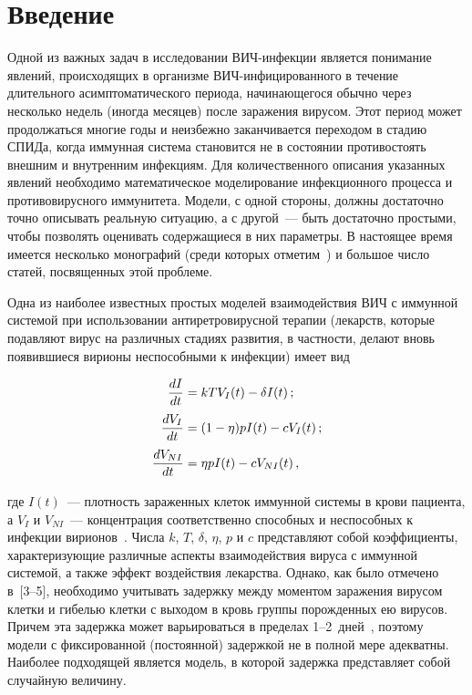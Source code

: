       \begin{multicols}{2}

      \label{st\stat}


\section{Введение}

Одной из важных задач в исследовании ВИЧ-ин\-фек\-ции  является
понимание явлений, происходящих в организме ВИЧ-инфицированного в
течение длительного асимптоматического периода, начинающегося
обычно через несколько недель (иногда месяцев) после заражения
вирусом. Этот период может продолжаться многие годы и неизбежно
заканчивается переходом в стадию СПИДа, когда иммунная система
становится не в состоянии противостоять внешним и внутренним
инфекциям. Для количественного описания указанных явлений
необходимо математическое моделирование инфекционного процесса и
противовирусного иммунитета. Модели, с одной стороны, должны
достаточно точно описывать реальную ситуацию, а с другой~--- быть
достаточно простыми, чтобы позволять оценивать содержащиеся в них
параметры. В настоящее время имеется несколько монографий (среди
которых отметим~\cite{1us}) и большое число статей, посвященных этой
проблеме.

Одна из наиболее известных простых моделей взаимодействия ВИЧ с
иммунной системой при использовании антиретровирусной терапии
(лекарств, которые подавляют вирус на различных стадиях развития,
в частности, делают вновь появившиеся вирионы неспособными к
инфекции) имеет вид 

\vspace*{-8pt}
\noindent
\begin{align} 
\displaystyle\frac{\displaystyle dI\mathstrut}{\displaystyle dt\mathstrut}&=kTV_I(t)-\delta I(t)\,;  \notag\\
\displaystyle\frac{\displaystyle dV_I\mathstrut}{\displaystyle dt\mathstrut}&=(1-\eta)pI(t)-c V_I(t)\,;\label{1us}\\ 
\displaystyle\frac{\displaystyle dV_{NI}\mathstrut}{\displaystyle dt\mathstrut}&=\eta pI(t)-cV_{NI}(t)\,,\notag
\end{align} 
                                                                                                                                                                                                             

\noindent
где $I(t)$~--- плотность зараженных клеток иммунной системы в крови пациента, а
$V_I$ и $V_{NI}$~--- концентрация соответственно способных и
неспособных к инфекции вирионов~\cite{2us}. Числа $k$, $T$, $\delta$,
$\eta$, $p$ и $c$ представляют собой коэффициенты, характеризующие
различные аспекты взаимодействия вируса с иммунной системой, а
также эффект воздействия лекарства. Однако, как было отмечено в~[3--5], 
необходимо учитывать задержку между моментом заражения
вирусом клетки и гибелью клетки с выходом в кровь группы
порожденных ею вирусов. Причем эта задержка может варьироваться в
пределах 1--2~дней~\cite{4us}, поэтому модели с фиксированной
(постоянной) задержкой не в полной мере адекватны. Наиболее
подходящей является модель, в которой задержка представляет собой
случайную величину.


\end{multicols}
